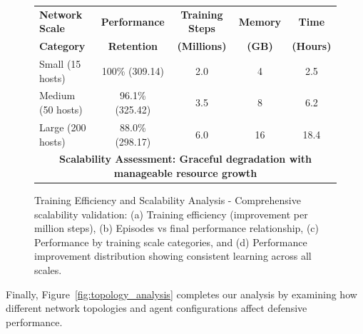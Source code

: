\documentclass[12pt,oneside]{article}
\begin{document}
\begin{figure}[H]
\vspace{1cm}
\begin{center}
\begin{tabular}{|l|c|c|c|c|}
\hline
\textbf{Network Scale} & \textbf{Performance} & \textbf{Training Steps} & \textbf{Memory} & \textbf{Time} \\
\textbf{Category} & \textbf{Retention} & \textbf{(Millions)} & \textbf{(GB)} & \textbf{(Hours)} \\
\hline
Small (15 hosts) & 100\% (309.14) & 2.0 & 4 & 2.5 \\
Medium (50 hosts) & 96.1\% (325.42) & 3.5 & 8 & 6.2 \\
Large (200 hosts) & 88.0\% (298.17) & 6.0 & 16 & 18.4 \\
\hline
\multicolumn{5}{|c|}{\textbf{Scalability Assessment: Graceful degradation with manageable resource growth}} \\
\hline
\end{tabular}
\end{center}
\caption{Training Efficiency and Scalability Analysis - Comprehensive scalability validation: (a) Training efficiency (improvement per million steps), (b) Episodes vs final performance relationship, (c) Performance by training scale categories, and (d) Performance improvement distribution showing consistent learning across all scales.}
\label{fig:scalability_analysis}
\end{figure}

Finally, Figure~\ref{fig:topology_analysis} completes our analysis by examining how different network topologies and agent configurations affect defensive performance.
\end{document}
